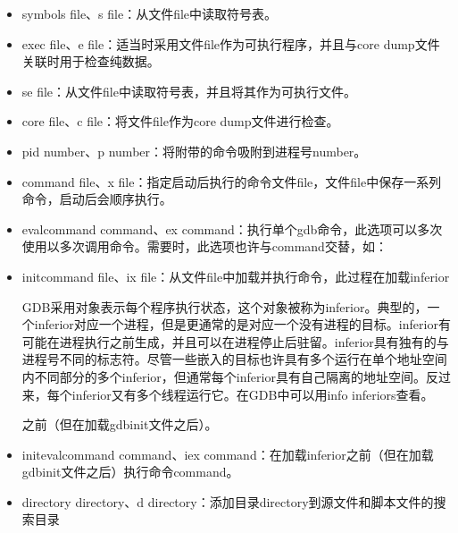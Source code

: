 \documentclass[a4paper,12pt,english]{sphinxmanual}
\begin{document}
\begin{itemize}
\item {} 
\sphinxAtStartPar
\sphinxhyphen{}symbols file、\sphinxhyphen{}s file：从文件file中读取符号表。

\item {} 
\sphinxAtStartPar
\sphinxhyphen{}exec file、\sphinxhyphen{}e file：适当时采用文件file作为可执行程序，并且与core dump文件关联时用于检查纯数据。

\item {} 
\sphinxAtStartPar
\sphinxhyphen{}se file：从文件file中读取符号表，并且将其作为可执行文件。

\item {} 
\sphinxAtStartPar
\sphinxhyphen{}core file、\sphinxhyphen{}c file：将文件file作为core dump文件进行检查。

\item {} 
\sphinxAtStartPar
\sphinxhyphen{}pid number、\sphinxhyphen{}p number：将附带的命令吸附到进程号number。

\item {} 
\sphinxAtStartPar
\sphinxhyphen{}command file、\sphinxhyphen{}x file：指定启动后执行的命令文件file，文件file中保存一系列命令，启动后会顺序执行。

\item {} 
\sphinxAtStartPar
\sphinxhyphen{}eval\sphinxhyphen{}command command、\sphinxhyphen{}ex command：执行单个gdb命令，此选项可以多次使用以多次调用命令。需要时，此选项也许与\sphinxhyphen{}command交替，如：

\sphinxAtStartPar
{}

\item {} 
\sphinxAtStartPar
\sphinxhyphen{}init\sphinxhyphen{}command file、\sphinxhyphen{}ix file：从文件file中加载并执行命令，此过程在加载inferior %
\begin{footnote}[1]\sphinxAtStartFootnote
GDB采用对象表示每个程序执行状态，这个对象被称为inferior。典型的，一个inferior对应一个进程，但是更通常的是对应一个没有进程的目标。inferior有可能在进程执行之前生成，并且可以在进程停止后驻留。inferior具有独有的与进程号不同的标志符。尽管一些嵌入的目标也许具有多个运行在单个地址空间内不同部分的多个inferior，但通常每个inferior具有自己隔离的地址空间。反过来，每个inferior又有多个线程运行它。在GDB中可以用info
inferiors查看。
%
\end{footnote} 之前（但在加载gdbinit文件之后）。

\item {} 
\sphinxAtStartPar
\sphinxhyphen{}init\sphinxhyphen{}eval\sphinxhyphen{}command command、\sphinxhyphen{}iex command：在加载inferior之前（但在加载gdbinit文件之后）执行命令command。

\item {} 
\sphinxAtStartPar
\sphinxhyphen{}directory directory、\sphinxhyphen{}d directory：添加目录directory到源文件和脚本文件的搜索目录

\end{itemize}
\end{document}
